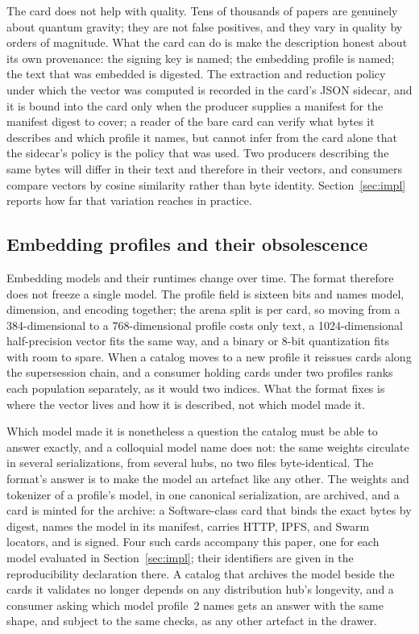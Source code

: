 \documentclass[sigconf]{acmart}
\begin{document}
The card does not help with quality. Tens of thousands of papers are
genuinely about quantum gravity; they are not false positives, and they vary
in quality by orders of magnitude. What the card can do is make the
description honest about its own provenance: the signing key is named; the
embedding profile is named; the text that was embedded is digested. The
extraction and reduction policy under which the vector was computed is
recorded in the card's JSON sidecar, and it is bound into the card only when
the producer supplies a manifest for the manifest digest to cover; a reader
of the bare card can verify what bytes it describes and which profile it
names, but cannot infer from the card alone that the sidecar's policy is the
policy that was used. Two producers describing the same bytes will differ in
their text and therefore in their vectors, and consumers compare vectors by
cosine similarity rather than byte identity. Section~\ref{sec:impl} reports
how far that variation reaches in practice.

\subsection{Embedding profiles and their obsolescence}
\label{sec:profiles}

Embedding models and their runtimes change over time. The format therefore
does not freeze a single model. The profile field is sixteen bits and names
model, dimension, and encoding together; the arena split is per card, so
moving from a 384-dimensional to a 768-dimensional profile costs only text, a
1024-dimensional half-precision vector fits the same way, and a binary or
8-bit quantization fits with room to spare. When a catalog moves to a new
profile it reissues cards along the supersession chain, and a consumer
holding cards under two profiles ranks each population separately, as it
would two indices. What the format fixes is where the vector lives and how it
is described, not which model made it.

Which model made it is nonetheless a question the catalog must be able to
answer exactly, and a colloquial model name does not: the same weights
circulate in several serializations, from several hubs, no two files
byte-identical. The format's answer is to make the model an artefact like
any other. The weights and tokenizer of a profile's model, in one canonical
serialization, are archived, and a card is minted for the archive: a
Software-class card that binds the exact bytes by digest, names the model in
its manifest, carries HTTP, IPFS, and Swarm locators, and is signed. Four
such cards accompany this paper, one for each model evaluated in
Section~\ref{sec:impl}; their identifiers are given in the reproducibility
declaration there. A catalog that archives the model beside the cards it
validates no longer depends on any distribution hub's longevity, and a
consumer asking which model profile~2 names gets an answer with the same
shape, and subject to the same checks, as any other artefact in the drawer.
\end{document}

